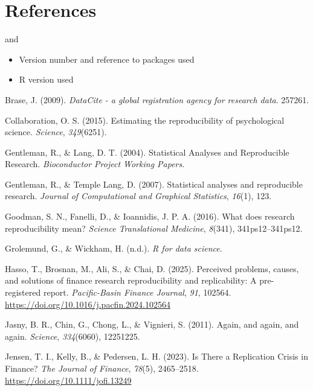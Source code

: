 \documentclass[
  a4paper,
]{article}
\providecommand{\tightlist}{%
  \setlength{\itemsep}{0pt}\setlength{\parskip}{0pt}}\usepackage{longtable,booktabs,array}
\newlength{\cslhangindent}
\newenvironment{CSLReferences}[2] %
 {\begin{list}{}{%
  \setlength{\itemindent}{0pt}
  \setlength{\leftmargin}{0pt}
  \setlength{\parsep}{0pt}
  \ifodd #1
   \setlength{\leftmargin}{\cslhangindent}
   \setlength{\itemindent}{-1\cslhangindent}
  \fi
  \setlength{\itemsep}{#2\baselineskip}}}
 {\end{list}}
\begin{document}
\section{References}\label{references}

and

\begin{itemize}
\tightlist
\item
  Version number and reference to packages used
\item
  R version used
\end{itemize}

\label{refs}
\begin{CSLReferences}{1}{0}
Brase, J. (2009). \emph{DataCite - a global registration agency for
research data}. 257261.

Collaboration, O. S. (2015). Estimating the reproducibility of
psychological science. \emph{Science}, \emph{349}(6251).

Gentleman, R., \& Lang, D. T. (2004). Statistical {Analyses} and
{Reproducible Research}. \emph{Bioconductor Project Working Papers}.

Gentleman, R., \& Temple Lang, D. (2007). Statistical analyses and
reproducible research. \emph{Journal of Computational and Graphical
Statistics}, \emph{16}(1), 123.

Goodman, S. N., Fanelli, D., \& Ioannidis, J. P. A. (2016). What does
research reproducibility mean? \emph{Science Translational Medicine},
\emph{8}(341), 341ps12--341ps12.

Grolemund, G., \& Wickham, H. (n.d.). \emph{R for data science}.

Hasso, T., Brosnan, M., Ali, S., \& Chai, D. (2025). Perceived problems,
causes, and solutions of finance research reproducibility and
replicability: A pre-registered report. \emph{Pacific-Basin Finance
Journal}, \emph{91}, 102564.
\url{https://doi.org/10.1016/j.pacfin.2024.102564}

Jasny, B. R., Chin, G., Chong, L., \& Vignieri, S. (2011). Again, and
again, and again. \emph{Science}, \emph{334}(6060), 12251225.

Jensen, T. I., Kelly, B., \& Pedersen, L. H. (2023). Is There a
Replication Crisis in Finance? \emph{The Journal of Finance},
\emph{78}(5), 2465--2518. \url{https://doi.org/10.1111/jofi.13249}


\end{CSLReferences}
\end{document}

